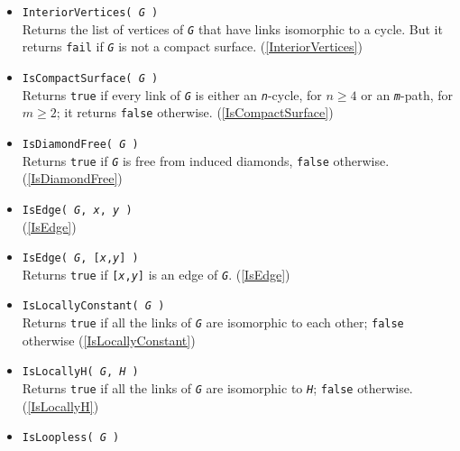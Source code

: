 \documentclass[a4paper,11pt]{report}
\begin{document}
{{\begin{itemize}
 Returns statistics for graph attribute \mbox{\texttt{\mdseries\slshape Attribute}}. (\ref{GraphAttributeStatistics}) 
\item \texttt{InteriorVertices( \mbox{\texttt{\mdseries\slshape G}} )}\\
 Returns the list of vertices of \mbox{\texttt{\mdseries\slshape G}} that have links isomorphic to a cycle. But it returns \texttt{fail} if \mbox{\texttt{\mdseries\slshape G}} is not a compact surface. (\ref{InteriorVertices}) 
\item \texttt{IsCompactSurface( \mbox{\texttt{\mdseries\slshape G}} )}\\
 Returns \texttt{true} if every link of \mbox{\texttt{\mdseries\slshape G}} is either an \mbox{\texttt{\mdseries\slshape n}}-cycle, for $n\geq 4$ or an \mbox{\texttt{\mdseries\slshape m}}-path, for $m\geq 2$; it returns \texttt{false} otherwise. (\ref{IsCompactSurface}) 
\item \texttt{IsDiamondFree( \mbox{\texttt{\mdseries\slshape G}} )}\\
 Returns \texttt{true} if \mbox{\texttt{\mdseries\slshape G}} is free from induced diamonds, \texttt{false} otherwise. (\ref{IsDiamondFree}) 
\item \texttt{IsEdge( \mbox{\texttt{\mdseries\slshape G}}, \mbox{\texttt{\mdseries\slshape x}}, \mbox{\texttt{\mdseries\slshape y}} )}\\
 (\ref{IsEdge}) 
\item \texttt{IsEdge( \mbox{\texttt{\mdseries\slshape G}}, [\mbox{\texttt{\mdseries\slshape x}},\mbox{\texttt{\mdseries\slshape y}}] )}\\
 Returns \texttt{true} if \texttt{[\mbox{\texttt{\mdseries\slshape x}},\mbox{\texttt{\mdseries\slshape y}}]} is an edge of \mbox{\texttt{\mdseries\slshape G}}. (\ref{IsEdge}) 
\item \texttt{IsLocallyConstant( \mbox{\texttt{\mdseries\slshape G}} )}\\
 Returns \texttt{true} if all the links of \mbox{\texttt{\mdseries\slshape G}} are isomorphic to each other; \texttt{false} otherwise (\ref{IsLocallyConstant}) 
\item \texttt{IsLocallyH( \mbox{\texttt{\mdseries\slshape G}}, \mbox{\texttt{\mdseries\slshape H}} )}\\
 Returns \texttt{true} if all the links of \mbox{\texttt{\mdseries\slshape G}} are isomorphic to \mbox{\texttt{\mdseries\slshape H}}; \texttt{false} otherwise. (\ref{IsLocallyH}) 
\item \texttt{IsLoopless( \mbox{\texttt{\mdseries\slshape G}} )}\\

\end{itemize}}}
\end{document}
